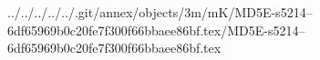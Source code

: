 ../../../../../.git/annex/objects/3m/mK/MD5E-s5214--6df65969b0c20fe7f300f66bbaee86bf.tex/MD5E-s5214--6df65969b0c20fe7f300f66bbaee86bf.tex